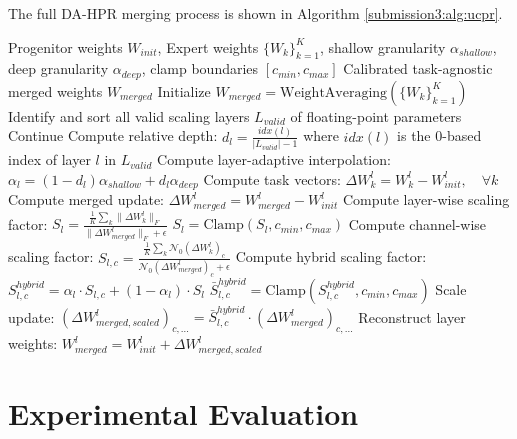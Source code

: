 \documentclass{article}
\theoremstyle{plain}
\theoremstyle{definition}
\theoremstyle{remark}
\begin{document}
The full DA-HPR merging process is shown in Algorithm \ref{submission3:alg:ucpr}.

\begin{algorithm}[tb]
\caption{Depth-Adaptive Hybrid Parameter Resonance (DA-HPR)}
\label{submission3:alg:ucpr}
\begin{algorithmic}[1]
 Progenitor weights $W_{init}$, Expert weights $\{W_k\}_{k=1}^K$, shallow granularity $\alpha_{shallow}$, deep granularity $\alpha_{deep}$, clamp boundaries $[c_{min}, c_{max}]$
 Calibrated task-agnostic merged weights $W_{merged}$
\STATE Initialize $W_{merged} = \text{WeightAveraging}(\{W_k\}_{k=1}^K)$
\STATE Identify and sort all valid scaling layers $L_{valid}$ of floating-point parameters
        \STATE Continue
    \ENDIF
    \STATE Compute relative depth: $d_l = \frac{idx(l)}{|L_{valid}| - 1}$ where $idx(l)$ is the 0-based index of layer $l$ in $L_{valid}$
    \STATE Compute layer-adaptive interpolation: $\alpha_l = (1 - d_l)\alpha_{shallow} + d_l\alpha_{deep}$
    \STATE Compute task vectors: $\Delta W_k^l = W_k^l - W_{init}^l, \quad \forall k$
    \STATE Compute merged update: $\Delta W_{merged}^l = W_{merged}^l - W_{init}^l$
    \STATE Compute layer-wise scaling factor:
    \STATE $S_l = \frac{\frac{1}{K} \sum_k \|\Delta W_k^l\|_F}{\|\Delta W_{merged}^l\|_F + \epsilon}$
    \STATE $S_l = \text{Clamp}(S_l, c_{min}, c_{max})$
        \STATE Compute channel-wise scaling factor:
        \STATE $S_{l,c} = \frac{\frac{1}{K} \sum_k \mathcal{N}_0(\Delta W_k^l)_c}{\mathcal{N}_0(\Delta W_{merged}^l)_c + \epsilon}$
        \STATE Compute hybrid scaling factor:
        \STATE $S_{l,c}^{hybrid} = \alpha_l \cdot S_{l,c} + (1-\alpha_l) \cdot S_l$
        \STATE $\bar{S}_{l,c}^{hybrid} = \text{Clamp}(S_{l,c}^{hybrid}, c_{min}, c_{max})$
        \STATE Scale update:
        \STATE $(\Delta W_{merged, scaled}^l)_{c, \dots} = \bar{S}_{l,c}^{hybrid} \cdot (\Delta W_{merged}^l)_{c, \dots}$
    \ENDFOR
    \STATE Reconstruct layer weights:
    \STATE $W_{merged}^l = W_{init}^l + \Delta W_{merged, scaled}^l$
\ENDFOR
\end{algorithmic}
\end{algorithm}

\section{Experimental Evaluation}
\label{submission3:sec:experiments}
\end{document}
